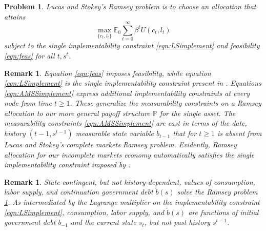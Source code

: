\documentclass[12pt]{article}
\newcommand{\EE}{\mathbb E}
\newtheorem{remark}[theorem]{Remark}
\newtheorem{problem}[theorem]{Problem}
\begin{document}
\begin{problem}\label{prob:RamseyLS}
Lucas and Stokey's Ramsey problem is to choose an allocation %
that attains %
\begin{equation}\label{eqn:RamseyobjLS}
\max_{\{c_t,l_t\}} \EE_0\sum_{t=0}^\infty \beta^t U(c_t,l_t)
 \end{equation}
 subject to the single implementability constraint \eqref{eqn:LSimplement} and feasibility \eqref{eqn:feas} for all $t, s^t$.
\end{problem}

\begin{remark} Equation \eqref{eqn:feas} imposes feasibility, while equation  \eqref{eqn:LSimplement} is the single implementability constraint
present in \citet{LucasJr.1983}.  Equations \eqref{eqn:AMSSimplement} express  additional
 implementability constraints at every node from time $t \geq 1$. These generalize the \citet{Aiyagari2002} measurability constraints on a Ramsey allocation  to our more general payoff structure ${\mathbb P}$ for the
single asset. The measurability constraints \eqref{eqn:AMSSimplement}  are cast
in terms of the date, history $(t-1, s^{t-1})$ measurable state variable $b_{t-1}$ that for $t \geq 1$ is absent from Lucas and Stokey's complete markets Ramsey problem.  Evidently, Ramsey allocation for our incomplete markets economy automatically satisfies the single implementability constraint imposed by \citeauthor{LucasJr.1983}.
\end{remark}


\begin{remark}\label{rem:LSdebt}
State-contingent, but not history-dependent,  values of consumption, labor supply, and continuation government debt $\check b(s)$ solve the \citet{LucasJr.1983} Ramsey problem \ref{prob:RamseyLS}.  As intermediated by the Lagrange multiplier on the implementability constraint \eqref{eqn:LSimplement},
consumption, labor supply, and $\check b(s)$ are  functions of initial government debt $b_{-1}$ and the current state $s_t$, but not past history $s^{t-1}$.
\end{remark}
\end{document}
